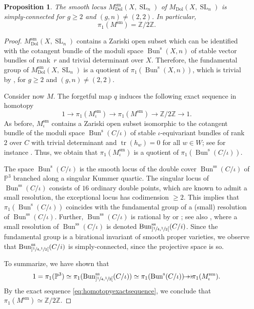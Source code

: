 \documentclass[JEP,XML,SOM,Unicode, NoEqCountersInSection,NoFloatCountersInSection,published]{cedram}
\newcommand{\onto}{\mathchoice{\to\hspace*{-5mm}\to}{\to\hspace*{-2.85mm}\to}{\to\hspace*{-3mm}\to}{\to\hspace*{-3mm}\to}}
\newtheorem{prop}[thm]{Proposition}
\theoremstyle{definition}
\newcommand{\PP}{\mathbb{P}}
\newcommand{\ZZ}{\mathbb{Z}}
\newcommand{\Sl}{\operatorname{SL}}
\newcommand{\NSl}{\operatorname{Bun}^\mathrm{s}}
\newcommand{\NSli}{\operatorname{Bun}^\mathrm{s}(C/\iota)}
\newcommand{\NSliss}{\operatorname{Bun}^\mathrm{ss}(C/\iota)}
\newcommand{\Tr}{\operatorname{tr}}
\newcommand{\MDolSl}{{M}_{\mathrm{Dol}}(X, \Sl_n)}
\newcommand{\MDolSlsm}{{M}^{\mathrm{sm}}_{\mathrm{Dol}}(X, \Sl_n)}
\begin{document}
\begin{prop}\label{lem:fundamentalgroupsmoothlocus}
The smooth locus $\MDolSlsm$ of $\MDolSl$ is simply-connected for $g \geq 2$ and $(g,n)\neq (2,2)$. In particular,
\[
\pi_1 (M^{\mathrm{sm}})=\ZZ/2\ZZ.
\]
\end{prop}
\begin{proof} $\MDolSlsm$ contains a Zariski open subset which can be identified with the cotangent bundle of the moduli space $\NSl(X,n)$ of stable vector bundles of rank~$r$ and trivial determinant over $X$.
Therefore, the fundamental group of $\MDolSlsm$ is a quotient of $\pi_1(\NSl(X,n))$, which is trivial by \cite[Th.\,3.2(i)]{DaskalopoulosUhlenbeck1995}, for $g \geq 2$ and $(g,n)\neq (2,2)$.

Consider now $M$. The forgetful map $q$ induces the following exact sequence in homotopy
\begin{equation}\label{eq:homotopyexactsequence}
1 \to \pi_1(M^{\mathrm{sm}}_{\iota}) \to \pi_1(M^{\mathrm{sm}}) \to \ZZ/2\ZZ \to 1.
\end{equation}
As before, $M^{\mathrm{sm}}_{\iota}$ contains a Zariski open subset isomorphic to the cotangent bundle of the moduli space $\NSli$ of stable $\iota$-equivariant bundles of rank $2$ over $C$ with trivial determinant and $\Tr(h_{w})=0$ for all $w \in W$; see for instance \cite[Chap.\,6,\,p.\,73]{HeuLoray19}. Thus, we obtain that
$\pi_1(M^{\mathrm{sm}}_{\iota})$ is a quotient of $\pi_1(\NSli)$.

The space $\NSli$ is the smooth locus of the double cover $\NSliss$ of $\PP^3$ branched along a singular Kummer quartic. The singular locus of $\NSliss$ consists of $16$ ordinary double points, which are known to admit a small resolution, \ie the exceptional locus has codimension $\geq 2$. This implies that $\pi_1(\NSli)$ coincides with the fundamental group of a (small) resolution of $\NSliss$. Further, $\NSliss$ is rational by \cite[Th.\,2.2]{Kumar00} or \cite[Th.\,1.3]{CPC19}; see also \cite[\S 5.4.2 \& \S 5.5]{HeuLoray19}, where a small resolution of $\NSliss$ is denoted $\operatorname{Bun}^\mathrm{ss}_{]\sfrac{1}{4}, \sfrac{1}{2}[}(C/i)$. Since the fundamental group is a birational invariant of smooth proper varieties, we observe that $\operatorname{Bun}^\mathrm{ss}_{]\sfrac{1}{4}, \sfrac{1}{2}[}(C/i)$ is simply-connected, since the projective space is so.

To summarize, we have shown that
\[
1= \pi_1(\PP^3)\simeq \pi_1(\operatorname{Bun}^\mathrm{ss}_{]\sfrac{1}{4}, \sfrac{1}{2}[}(C/\iota)) \simeq \pi_1(\NSli) \onto \pi_1(M^{\mathrm{sm}}_{\iota}).
\]
By the exact sequence \eqref{eq:homotopyexactsequence}, we conclude that $\pi_1(M^{\mathrm{sm}}) \simeq \ZZ/2\ZZ$.
\end{proof}
\end{document}
